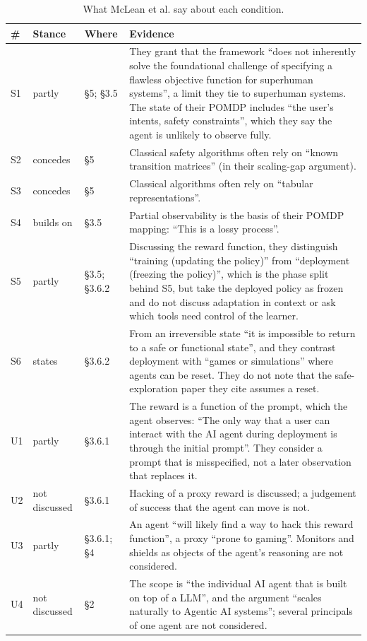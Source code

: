 \documentclass{article}
\begin{document}
\begin{table}[!htb]
\centering\small\setlength{\tabcolsep}{3pt}
\caption{What McLean et al. say about each condition.}\label{tab:mclean_stance}
\begin{tabularx}{\textwidth}{@{}lll>{\raggedright\arraybackslash}X@{}}
\toprule
\# & Stance & Where & Evidence \\
\midrule
S1 & partly & §5; §3.5 & They grant that the framework ``does not inherently solve the foundational challenge of specifying a flawless objective function for superhuman systems'', a limit they tie to superhuman systems. The state of their POMDP includes ``the user's intents, safety constraints'', which they say the agent is unlikely to observe fully. \\
S2 & concedes & §5 & Classical safety algorithms often rely on ``known transition matrices'' (in their scaling-gap argument). \\
S3 & concedes & §5 & Classical algorithms often rely on ``tabular representations''. \\
S4 & builds on & §3.5 & Partial observability is the basis of their POMDP mapping: ``This is a lossy process''. \\
S5 & partly & §3.5; §3.6.2 & Discussing the reward function, they distinguish ``training (updating the policy)'' from ``deployment (freezing the policy)'', which is the phase split behind S5, but take the deployed policy as frozen and do not discuss adaptation in context or ask which tools need control of the learner. \\
S6 & states & §3.6.2 & From an irreversible state ``it is impossible to return to a safe or functional state'', and they contrast deployment with ``games or simulations'' where agents can be reset. They do not note that the safe-exploration paper they cite assumes a reset. \\
U1 & partly & §3.6.1 & The reward is a function of the prompt, which the agent observes: ``The only way that a user can interact with the AI agent during deployment is through the initial prompt''. They consider a prompt that is misspecified, not a later observation that replaces it. \\
U2 & not discussed & §3.6.1 & Hacking of a proxy reward is discussed; a judgement of success that the agent can move is not. \\
U3 & partly & §3.6.1; §4 & An agent ``will likely find a way to hack this reward function'', a proxy ``prone to gaming''. Monitors and shields as objects of the agent's reasoning are not considered. \\
U4 & not discussed & §2 & The scope is ``the individual AI agent that is built on top of a LLM'', and the argument ``scales naturally to Agentic AI systems''; several principals of one agent are not considered. \\
\bottomrule
\end{tabularx}
\end{table}
\end{document}
